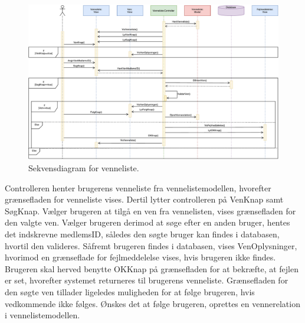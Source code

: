 \begin{figure} [H]
\centering
\includegraphics[width=1\textwidth]{figures/Sek/SEKVenneliste}
\caption{Sekvensdiagram for venneliste.}
\label{fig:SEKVenneliste}
\end{figure}

\noindent
Controlleren henter brugerens venneliste fra vennelistemodellen, hvorefter grænsefladen for venneliste vises. Dertil lytter controlleren på VenKnap samt SøgKnap. Vælger brugeren at tilgå en ven fra vennelisten, vises grænsefladen for den valgte ven. Vælger brugeren derimod at søge efter en anden bruger, hentes det indskrevne medlemsID, således den søgte bruger kan findes i databasen, hvortil den valideres. Såfremt brugeren findes i databasen, vises VenOplysninger, hvorimod en grænseflade for fejlmeddelelse vises, hvis brugeren ikke findes. Brugeren skal herved benytte OKKnap på grænsefladen for at bekræfte, at fejlen er set, hvorefter systemet returneres til brugerens venneliste.
Grænsefladen for den søgte ven tillader ligeledes muligheden for at følge brugeren, hvis vedkommende ikke følges. Ønskes det at følge brugeren, oprettes en vennerelation i vennelistemodellen. 







